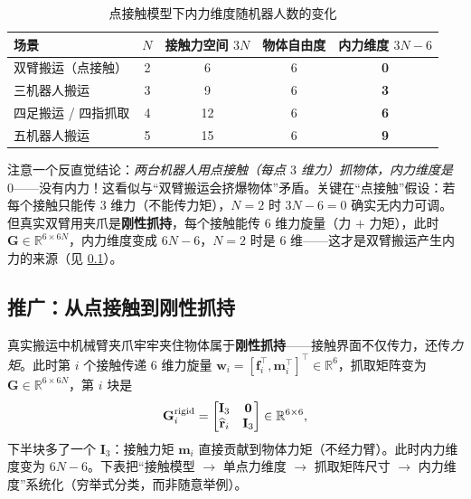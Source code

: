 \begin{table}[H]\centering\small
\caption{点接触模型下内力维度随机器人数的变化}
\label{tab:cm-null-examples}
\begin{tabular}{lcccc}
\toprule
场景 & $N$ & 接触力空间 $3N$ & 物体自由度 & 内力维度 $3N-6$ \\
\midrule
双臂搬运（点接触） & 2 & 6 & 6 & \textbf{0} \\
三机器人搬运 & 3 & 9 & 6 & \textbf{3} \\
四足搬运 / 四指抓取 & 4 & 12 & 6 & \textbf{6} \\
五机器人搬运 & 5 & 15 & 6 & \textbf{9} \\
\bottomrule
\end{tabular}
\end{table}

\noindent 注意一个反直觉结论：\emph{两台机器人用点接触（每点 $3$ 维力）抓物体，内力维度是 $0$}——没有内力！这看似与“双臂搬运会挤爆物体”矛盾。关键在“点接触”假设：若每个接触只能传 $3$ 维力（不能传力矩），$N=2$ 时 $3N-6=0$ 确实无内力可调。但真实双臂用夹爪是\textbf{刚性抓持}，每个接触能传 $6$ 维力旋量（力 $+$ 力矩），此时 $\mathbf{G}\in\mathbb{R}^{6\times 6N}$，内力维度变成 $6N-6$，$N=2$ 时是 $6$ 维——这才是双臂搬运产生内力的来源（见 \cref{sec:cm-grasp-rigid}）。

\subsection{推广：从点接触到刚性抓持}
\label{sec:cm-grasp-rigid}
真实搬运中机械臂夹爪牢牢夹住物体属于\textbf{刚性抓持}——接触界面不仅传力，还传\emph{力矩}。此时第 $i$ 个接触传递 $6$ 维力旋量 $\mathbf{w}_i=[\mathbf{f}_i^\top,\mathbf{m}_i^\top]^\top\in\mathbb{R}^6$，抓取矩阵变为 $\mathbf{G}\in\mathbb{R}^{6\times 6N}$，第 $i$ 块是
\begin{equation}
  \mathbf{G}_i^{\text{rigid}}=\begin{bmatrix}\mathbf{I}_3&\mathbf{0}\\ \widehat{\mathbf{r}}_i&\mathbf{I}_3\end{bmatrix}\in\mathbb{R}^{6\times 6},
  \label{eq:cm-Gi-rigid}
\end{equation}
下半块多了一个 $\mathbf{I}_3$：接触力矩 $\mathbf{m}_i$ 直接贡献到物体力矩（不经力臂）。此时内力维度变为 $6N-6$。下表把“接触模型 $\to$ 单点力维度 $\to$ 抓取矩阵尺寸 $\to$ 内力维度”系统化（穷举式分类，而非随意举例）。

